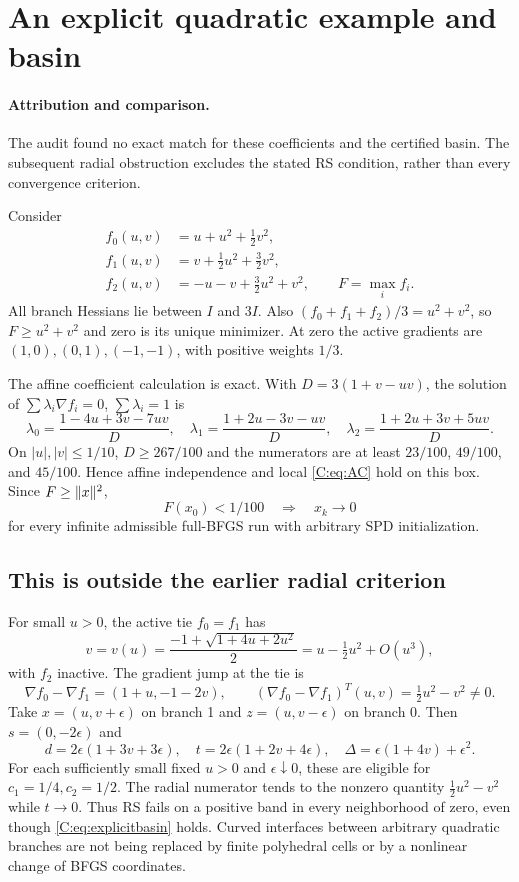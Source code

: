 \setcounter{section}{7}
\setcounter{theorem}{7}
\setcounter{equation}{16}
\section{An explicit quadratic example and basin}
\paragraph{Attribution and comparison.}
The audit found no exact match for these coefficients and the certified basin. The subsequent radial obstruction excludes the stated RS condition, rather than every convergence criterion.

Consider
\begin{align*}
 f_0(u,v)&=u+u^2+\tfrac12v^2,\\
 f_1(u,v)&=v+\tfrac12u^2+\tfrac32v^2,\\
 f_2(u,v)&=-u-v+\tfrac32u^2+v^2,\qquad F=\max_i f_i.
\end{align*}
All branch Hessians lie between $I$ and $3I$. Also $(f_0+f_1+f_2)/3=u^2+v^2$, so $F\ge u^2+v^2$ and zero is its unique minimizer. At zero the active gradients are $(1,0),(0,1),(-1,-1)$, with positive weights $1/3$.

The affine coefficient calculation is exact. With $D=3(1+v-uv)$, the solution of $\sum\lambda_i\nabla f_i=0$, $\sum\lambda_i=1$ is
\[
 \lambda_0=\frac{1-4u+3v-7uv}{D},\quad
 \lambda_1=\frac{1+2u-3v-uv}{D},\quad
 \lambda_2=\frac{1+2u+3v+5uv}{D}.
\]
On $|u|,|v|\le1/10$, $D\ge267/100$ and the numerators are at least $23/100$, $49/100$, and $45/100$. Hence affine independence and local \eqref{C:eq:AC} hold on this box. Since $F\ge\lVert x\rVert^2$,
\begin{equation}\label{C:eq:explicitbasin}
 \boxed{F(x_0)<1/100\quad\Longrightarrow\quad x_k\to0}
\end{equation}
for every infinite admissible full-BFGS run with arbitrary SPD initialization.

\subsection{This is outside the earlier radial criterion}
For small $u>0$, the active tie $f_0=f_1$ has
\[
 v=v(u)=\frac{-1+\sqrt{1+4u+2u^2}}2
 =u-\tfrac12u^2+O(u^3),
\]
with $f_2$ inactive. The gradient jump at the tie is
\[
 \nabla f_0-\nabla f_1=(1+u,-1-2v),\qquad
 (\nabla f_0-\nabla f_1)^T(u,v)=\tfrac12u^2-v^2\ne0.
\]
Take $x=(u,v+\epsilon)$ on branch 1 and $z=(u,v-\epsilon)$ on branch 0. Then $s=(0,-2\epsilon)$ and
\[
 d=2\epsilon(1+3v+3\epsilon),\quad
 t=2\epsilon(1+2v+4\epsilon),\quad
 \Delta=\epsilon(1+4v)+\epsilon^2.
\]
For each sufficiently small fixed $u>0$ and $\epsilon\downarrow0$, these are eligible for $c_1=1/4,c_2=1/2$. The radial numerator tends to the nonzero quantity $\tfrac12u^2-v^2$ while $t\to0$. Thus RS fails on a positive band in every neighborhood of zero, even though \eqref{C:eq:explicitbasin} holds. Curved interfaces between arbitrary quadratic branches are not being replaced by finite polyhedral cells or by a nonlinear change of BFGS coordinates.


